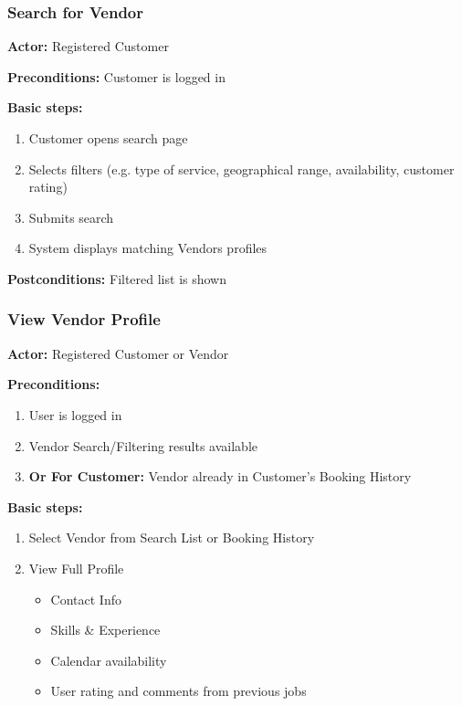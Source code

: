 \documentclass[11pt,a4paper]{article}
\begin{document}
\subsubsection{Search for Vendor}

\textbf{Actor:} Registered Customer

\noindent \textbf{Preconditions:} Customer is logged in

\noindent \textbf{Basic steps:}
\begin{enumerate}
  \item Customer opens search page
  \item Selects filters (e.g. type of service, geographical range,
    availability, customer rating)
  \item Submits search
  \item System displays matching Vendors profiles
\end{enumerate}

\noindent \textbf{Postconditions:} Filtered list is shown

\subsubsection{View Vendor Profile}

\textbf{Actor:} Registered Customer or Vendor

\noindent \textbf{Preconditions:}
\begin{enumerate}
  \item User is logged in
  \item Vendor Search/Filtering results available
  \item \textbf{Or For Customer:} Vendor already in Customer's Booking History
\end{enumerate}

\noindent \textbf{Basic steps:}
\begin{enumerate}
  \item Select Vendor from Search List or Booking History
  \item View Full Profile
    \begin{itemize}
      \item Contact Info
      \item Skills \& Experience
      \item Calendar availability
      \item User rating and comments from previous jobs
    \end{itemize}
\end{enumerate}
\end{document}
